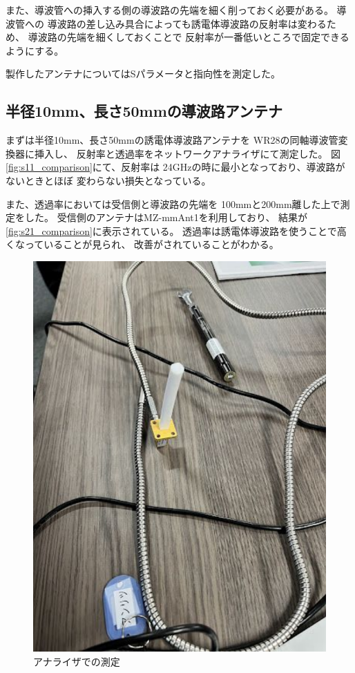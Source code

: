 \documentclass[technicalreport]{ieicej}
\begin{document}
また、導波管への挿入する側の導波路の先端を細く削っておく必要がある。
導波管への
導波路の差し込み具合によっても誘電体導波路の反射率は変わるため、
導波路の先端を細くしておくことで
反射率が一番低いところで固定できるようにする。

製作したアンテナについてはSパラメータと指向性を測定した。

\subsection{半径10mm、長さ50mmの導波路アンテナ}

まずは半径10mm、長さ50mmの誘電体導波路アンテナを
WR28の同軸導波管変換器に挿入し、
反射率と透過率をネットワークアナライザにて測定した。
図\ref{fig:s11_comparison}にて、反射率は
24GHzの時に最小となっており、導波路がないときとほぼ
変わらない損失となっている。

また、透過率においては受信側と導波路の先端を
100mmと200mm離した上で測定をした。
受信側のアンテナはMZ-mmAnt1を利用しており、
結果が\ref{fig:s21_comparison}に表示されている。
透過率は誘電体導波路を使うことで高くなっていることが見られ、
改善がされていることがわかる。

\begin{figure}[tb]
  \begin{center}
    \includegraphics[bb=0 0 288.000000 384.000000, width=0.5\linewidth]{img/50mm_10mm.pdf}
    \caption{アナライザでの測定}
    \label{fig:measurement_analyzer}
  \end{center}
\end{figure}
\end{document}
